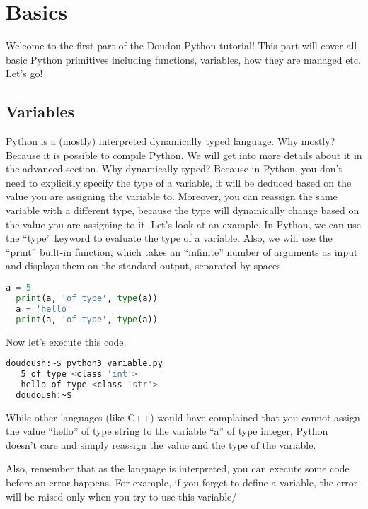 
\section{Basics}

Welcome to the first part of the Doudou Python tutorial!  This part
will cover all basic Python primitives including functions, variables,
how they are managed etc. Let's go!

\subsection{Variables}

Python is a (mostly) interpreted dynamically typed language. Why
mostly? Because it is possible to compile Python. We will get into
more details about it in the advanced section. Why dynamically typed?
Because in Python, you don't need to explicitly specify the type of a
variable, it will be deduced based on the value you are assigning the
variable to. Moreover, you can reassign the same variable with a
different type, because the type will dynamically change based on the
value you are assigning to it. Let's look at an example. In Python,
we can use the ``type'' keyword to evaluate the type of a variable.
Also, we will use the ``print'' built-in function, which takes an
``infinite'' number of arguments as input and displays them on the
standard output, separated by spaces.

\begin{lstlisting}[language=python]
  a = 5
  print(a, 'of type', type(a))
  a = 'hello'
  print(a, 'of type', type(a))
\end{lstlisting}

Now let's execute this code.

\begin{lstlisting}[language=bash]
  doudoush:~$ python3 variable.py
   5 of type <class 'int'>
   hello of type <class 'str'>
  doudoush:~$
\end{lstlisting}

While other languages (like C++) would have complained that you cannot assign
the value ``hello'' of type string to the variable ``a'' of type integer, Python
doesn't care and simply reassign the value and the type of the variable.

\vspace{5mm}
Also, remember that as the language is interpreted, you can execute some code before
an error happens. For example, if you forget to define a variable, the error will
be raised only when you try to use this variable/

